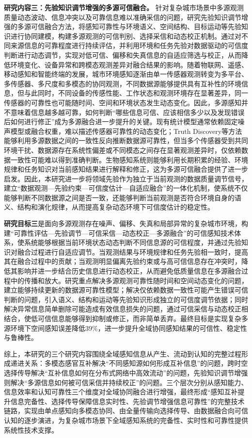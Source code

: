 \textbf{研究内容三：先验知识调节增强的多源可信融合。}
针对复杂城市场景中多源观测质量动态波动、信息冲突以及可靠信息难以准确采信的问题，研究先验知识调节增强的多源可信融合方法，将感知可靠性与环境语义、空间结构、目标运动等先验知识进行协同建模，构建多源观测的可信判别、选择采信和动态校正机制。通过对不同来源信息的可靠程度进行持续评估，并利用环境和任务先验对数据驱动的可信度判断进行动态调节，实现对低可信、偏移和失真信息的自适应筛选与校正，从而降低环境变化、设备异常和跨模态观测差异对融合结果的影响。随着物联网、遥感、移动感知和智能终端的发展，城市环境感知逐渐由单一传感器观测转变为多平台、多传感器、多尺度和多模态的协同观测，不同数据源能够提供具有互补性的环境信息，但与此同时，不同设备的传感性能、工作状态和观测环境存在显著差异，同一传感器的可靠性也可能随时间、空间和环境状态发生动态变化。因此，多源感知并不意味着信息越多越可靠，如何判断“哪些信息可信、应该相信多少以及发现错误后如何进行修正”成为多源融合进一步提升的关键。现有统计模型通常依赖固定噪声模型或融合权重，难以描述传感器可靠性的动态变化；Truth Discovery等方法能够利用多源数据之间的一致性反向推断数据源可靠性，但当多个传感器受到共同环境干扰、数据源存在系统性偏差或不同模态之间存在显著观测差异时，仅依赖数据一致性可能难以得到准确判断。生物感知系统则能够利用长期积累的经验、环境规律和任务知识对当前感知结果进行解释和修正，这为多源可信融合提供了进一步启发。因此，本研究进一步将领域先验作为独立于当前观测的数据质量调节信号，建立“数据观测—先验约束—可信度估计—自适应融合”的一体化机制，使系统不仅能够判断不同数据源之间是否一致，还能够判断当前观测是否符合环境自身的语义、结构和演化规律，从而提高复杂动态环境下可信度估计的稳定性。

\textbf{研究目标三}是面向多源观测存在噪声、偏移、失真和局部异常的复杂城市环境，构建“可靠性评估—先验调节—可信采信—动态校正—多源融合”的可信感知技术体系，使系统能够根据当前环境状态动态判断不同信息源的可信程度，并通过先验知识对融合过程进行自适应调节。当观测结果与环境规律和任务先验相一致时，提高其在融合过程中的贡献；当观测明显偏离先验约束或与高可信信息存在冲突时，降低其影响并进一步结合历史信息进行动态校正，从而避免低质量信息在多源融合过程中的传播和放大。研究重点解决多源观测可靠性随时间和空间动态变化的问题，建立能够持续更新的数据源可靠性模型；解决仅依赖数据一致性可能产生错误可信判断的问题，引入语义、结构和运动等先验知识形成独立的可信度调节依据；同时解决异常信息简单删除可能造成有效信息损失的问题，通过可信采信与动态校正相结合，使低可信信息能够得到抑制或修正，而非简单丢弃。最终目标是实现复杂多源环境下空间感知误差降低39\%，进一步提升全域协同感知结果的可信性、稳定性与鲁棒性。

综上，本研究的三个研究内容围绕全域感知信息从产生、流动到认知的完整过程形成递进关系：多模态感官互补解决“不同感知源如何形成互补信息”的问题，跨时空选择传导解决“互补信息如何在分布式网络中高效流动”的问题，先验知识调节增强则解决“多源信息如何被可信采信并持续校正”的问题。三个层次分别从感知能力、信息效率和认知可靠性三个维度对全域协同融合进行增强，最终形成“感知互补提升信息完备性、选择传导保障信息实时性、先验调节增强信息可靠性”的完整技术链路，实现由单点感知向多模态协同、由全量传输向选择传导、由数据融合向可信认知的逐步演进，为复杂城市场景下全域感知系统的完备性、实时性和可靠性提供系统性技术支撑。

